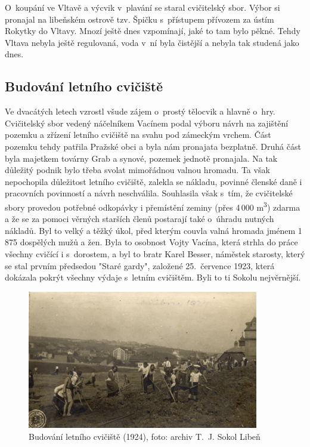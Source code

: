 \documentclass[a5paper, 11pt, twoside]{article}
\begin{document}
O~koupání ve Vltavě a výcvik v~plavání se staral cvičitelský sbor. Výbor
si pronajal na libeňském ostrově tzv. Špičku s~přístupem přívozem za
ústím Rokytky do Vltavy. Mnozí ještě dnes vzpomínají, jaké to tam bylo
pěkné. Tehdy Vltava nebyla ještě regulovaná, voda v~ní byla čistější a
nebyla tak studená jako dnes.

\subsection{Budování letního
cvičiště}

Ve dvacátých letech vzrostl všude zájem o~prostý tělocvik a hlavně
o~hry. Cvičitelský sbor vedený náčelníkem Vacínem podal výboru návrh na
zajištění pozemku a zřízení letního cvičiště na svahu pod zámeckým
vrchem. Část pozemku tehdy patřila Pražské obci a byla nám pronajata
bezplatně. Druhá část byla majetkem továrny Grab a synové, pozemek
jednotě pronajala. Na tak důležitý podnik bylo třeba svolat mimořádnou
valnou hromadu. Ta však nepochopila důležitost letního cvičiště, zalekla
se nákladu, povinné členské daně i pracovních povinností a návrh
neschválila. Souhlasila však s~tím, že cvičitelské sbory provedou
potřebné odkopávky i přemístění zeminy (přes 4\,000 m\textsuperscript{3})
zdarma a že se za pomoci věrných starších členů postarají také o~úhradu
nutných nákladů. Byl to velký a těžký úkol, před kterým couvla valná
hromada jménem 1\,875 dospělých mužů a žen. Byla to osobnost Vojty
Vacína, která strhla do práce všechny cvičící i s~dorostem, a byl to
bratr Karel Besser, náměstek starosty, který se stal prvním předsedou
"Staré gardy", založené 25.~července 1923, která dokázala pokrýt
všechny výdaje s~letním cvičištěm. Byli to ti Sokolu nejvěrnější.

\begin{figure}[h!]
  \centering 
  \includegraphics[width=0.9\textwidth]{img/25_budovani_cviciste.jpg}
  \caption*{Budování letního cvičiště (1924), foto: archiv T.~J. Sokol Libeň}
\end{figure}
\end{document}
